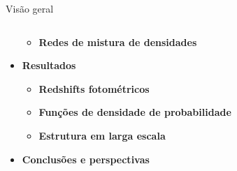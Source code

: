 \begin{frame}[c]{Visão geral}
\begin{columns}[c]
\begin{column}{0.48\linewidth}
\begin{splusbox}{}
\begin{itemize}
\begin{itemize}
                        \item \textbf{Redes de mistura de densidades}
                    \end{itemize}
                    \item \textbf{Resultados}
                    \begin{itemize}
                        \item \textbf{Redshifts fotométricos}
                        \item \textbf{Funções de densidade de probabilidade}
                        \item \textbf{Estrutura em larga escala}
                    \end{itemize}
                    \item \textbf{Conclusões e perspectivas}
                \end{itemize}
            \end{splusbox}
        \end{column}
    \end{columns}








\end{frame}

